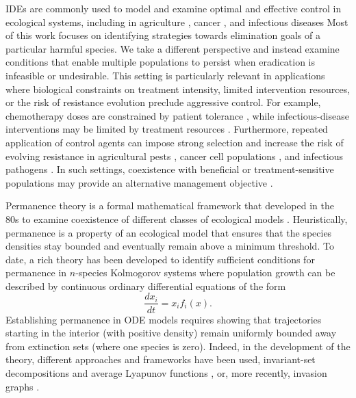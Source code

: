 \documentclass{article}
\theoremstyle{definition}
\begin{document}
IDEs are commonly used to model and examine optimal and effective control in ecological systems, including in agriculture \cite{mailleret_pulsed_biocontrol_2009, tang_periodic_lv_2002, tang2010optimum}, cancer \cite{diovidio_pulsed_cell_pop_2024}, and infectious diseases \cite{agur1993pulse, shulgin1998pulse, donofrio2002pulse, patel2025anthelmintic}
Most of this work focuses on identifying strategies towards elimination goals of a particular harmful species. We take a different perspective and instead examine conditions that enable multiple populations to persist when eradication is infeasible or undesirable. This setting is particularly relevant in applications where biological constraints on treatment intensity, limited intervention resources, or the risk of resistance evolution preclude aggressive control. For example, chemotherapy doses are constrained by patient tolerance \cite{wong2015dose}, while infectious-disease interventions may be limited by treatment resources \cite{hansen2011optimal}. Furthermore, repeated application of control agents can impose strong selection and increase the risk of evolving resistance in agricultural pests \cite{karlssongreen2020making}, cancer cell populations \cite{foo2014evolution}, and infectious pathogens \cite{andersson2010antibiotic}. In such settings, coexistence with beneficial or treatment-sensitive populations may provide an alternative management objective \cite{gatenby_cost_of_resistance_2009, whelan2020resistance}.



Permanence theory is a formal mathematical framework that developed in the 80s to examine coexistence of different classes of ecological models \cite{hutson_overview_persistence_1999}.
Heuristically, permanence is a property of an ecological model that ensures that the species densities stay bounded and eventually remain above a minimum threshold.  
To date, a rich theory has been developed \cite{gard1987uniform, sigmund1984permanence, garay_hofbauer_2003, patel_schreiber_2018, HofbauerSchreiber2022InvasionGraphs} 
to identify sufficient conditions for permanence in $n$-species Kolmogorov systems where population growth can be described by continuous ordinary differential equations of the form
\begin{equation}\label{kolm}
    \frac{dx_i}{dt} = x_i f_i(x).
\end{equation}
Establishing permanence in ODE models requires showing that trajectories starting in the interior (with positive density) remain uniformly bounded away from extinction sets (where one species is zero). Indeed, in the development of the theory, different approaches and frameworks have been used, invariant-set decompositions and average Lyapunov functions \cite{garay_hofbauer_2003, law_permanence_1996, patel_schreiber_2018}, or, more recently, invasion graphs \cite{HofbauerSchreiber2022InvasionGraphs, spaak2023building}.
\end{document}
